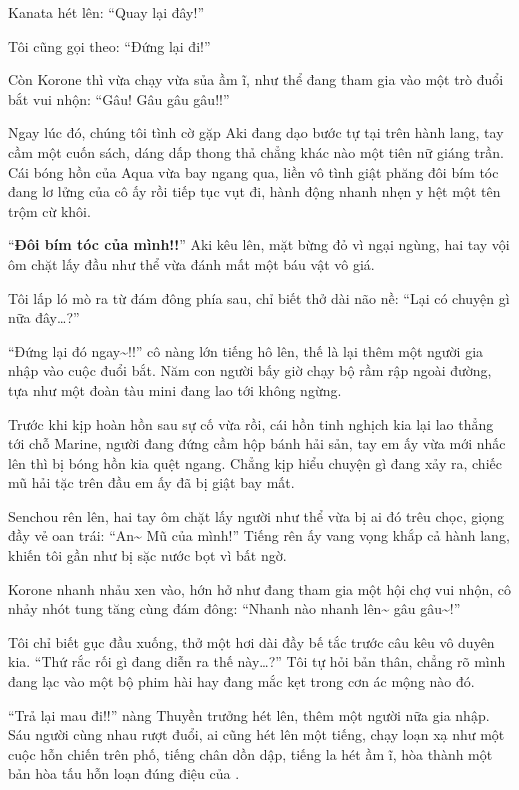 \documentclass[../main.tex]{subfiles}
\begin{document}
Kanata hét lên: ``Quay lại đây!''

Tôi cũng gọi theo: ``Đứng lại đi!''

Còn Korone thì vừa chạy vừa sủa ầm ĩ, như thể đang tham gia vào một trò đuổi bắt vui nhộn: ``Gâu! Gâu gâu gâu!!''

Ngay lúc đó, chúng tôi tình cờ gặp Aki đang dạo bước tự tại trên hành lang, tay cầm một cuốn sách, dáng dấp thong thả chẳng khác nào một tiên nữ giáng trần. Cái bóng hồn của Aqua vừa bay ngang qua, liền vô tình giật phăng đôi bím tóc đang lơ lửng của cô ấy rồi tiếp tục vụt đi, hành động nhanh nhẹn y hệt một tên trộm cừ khôi.

``\textbf{Đôi bím tóc của mình!!}'' Aki kêu lên, mặt bừng đỏ vì ngại ngùng, hai tay vội ôm chặt lấy đầu như thể vừa đánh mất một báu vật vô giá.

Tôi lấp ló mò ra từ đám đông phía sau, chỉ biết thở dài não nề: ``Lại có chuyện gì nữa đây\dots?''

``Đứng lại đó ngay\~{}!!'' cô nàng lớn tiếng hô lên, thế là lại thêm một người gia nhập vào cuộc đuổi bắt. Năm con người bấy giờ chạy bộ rầm rập ngoài đường, tựa như một đoàn tàu mini đang lao tới không ngừng.


Trước khi kịp hoàn hồn sau sự cố vừa rồi, cái hồn tinh nghịch kia lại lao thẳng tới chỗ Marine, người đang đứng cầm hộp bánh hải sản, tay em ấy vừa mới nhấc lên thì bị bóng hồn kia quệt ngang. Chẳng kịp hiểu chuyện gì đang xảy ra, chiếc mũ hải tặc trên đầu em ấy đã bị giật bay mất.

Senchou rên lên, hai tay ôm chặt lấy người như thể vừa bị ai đó trêu chọc, giọng đầy vẻ oan trái: ``An\~{} Mũ của mình!'' Tiếng rên ấy vang vọng khắp cả hành lang, khiến tôi gần như bị sặc nước bọt vì bất ngờ.

Korone nhanh nhảu xen vào, hớn hở như đang tham gia một hội chợ vui nhộn, cô nhảy nhót tung tăng cùng đám đông: ``Nhanh nào nhanh lên\~{} gâu gâu\~{}!''

Tôi chỉ biết gục đầu xuống, thở một hơi dài đầy bế tắc trước câu kêu vô duyên kia. ``Thứ rắc rối gì đang diễn ra thế này\dots?'' Tôi tự hỏi bản thân, chẳng rõ mình đang lạc vào một bộ phim hài hay đang mắc kẹt trong cơn ác mộng nào đó.

``Trả lại mau đi!!'' nàng Thuyền trưởng hét lên, thêm một người nữa gia nhập. Sáu người cùng nhau rượt đuổi, ai cũng hét lên một tiếng, chạy loạn xạ như một cuộc hỗn chiến trên phố, tiếng chân dồn dập, tiếng la hét ầm ĩ, hòa thành một bản hòa tấu hỗn loạn đúng điệu của \hll.
\end{document}
